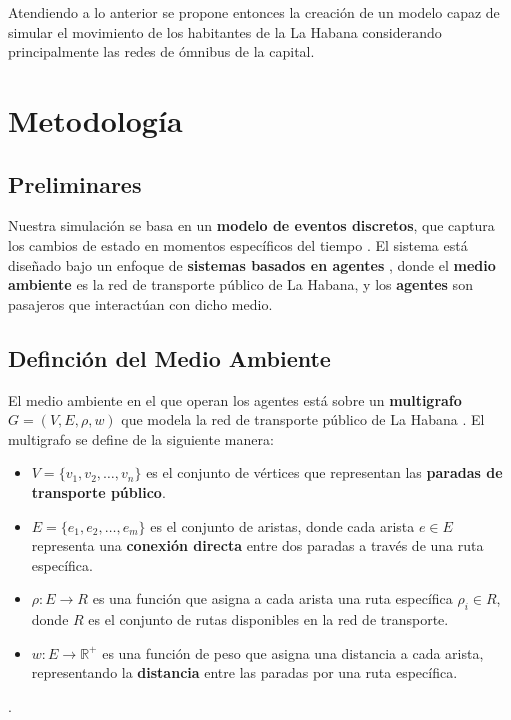 \documentclass[a4paper,12pt]{article}
\begin{document}
Atendiendo a lo anterior se propone entonces la creaci\'on de un modelo capaz de simular el movimiento de los habitantes de la La Habana considerando principalmente las redes de \'omnibus de la capital. 

\section{Metodología}
\subsection{Preliminares}
Nuestra simulación se basa en un \textbf{modelo de eventos discretos}, que captura los cambios de estado en momentos específicos del tiempo \cite{law2014simulation}. El sistema está diseñado bajo un enfoque de \textbf{sistemas basados en agentes} \cite{wooldridge2009introduction}, donde el \textbf{medio ambiente} es la red de transporte público de La Habana, y los \textbf{agentes} son pasajeros que interactúan con dicho medio.

\subsection{Definci\'on del Medio Ambiente}

El medio ambiente en el que operan los agentes está sobre un \textbf{multigrafo} $G = (V, E, \rho, w)$ que modela la red de transporte público de La Habana \cite{evans2021public}. El multigrafo se define de la siguiente manera:

\begin{itemize}
    \item $V = \{v_1, v_2, \dots, v_n\}$ es el conjunto de vértices que representan las \textbf{paradas de transporte público}.
    \item $E = \{e_1, e_2, \dots, e_m\}$ es el conjunto de aristas, donde cada arista $e \in E$ representa una \textbf{conexión directa} entre dos paradas a través de una ruta específica.
    \item $\rho: E \rightarrow R$ es una función que asigna a cada arista una ruta específica $\rho_i \in R$, donde $R$ es el conjunto de rutas disponibles en la red de transporte.
    \item $w: E \rightarrow \mathbb{R}^+$ es una función de peso que asigna una distancia a cada arista, representando la \textbf{distancia} entre las paradas por una ruta específica.
\end{itemize}.
\end{document}
